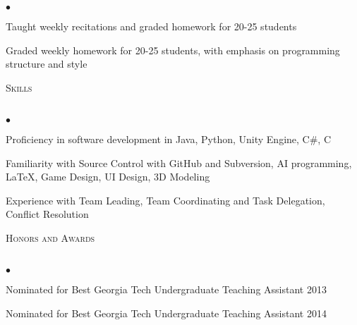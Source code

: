 \documentclass{article}
\newcommand{\lineunder}{\vspace*{-8pt} \\ \hspace*{-18pt} \hrulefill \\}
\newcommand{\header}[1]{{\hspace*{-15pt}\vspace*{6pt} \textsc{#1}} \vspace*{-6pt} \lineunder}
\newenvironment{achievements}{\begin{list}{$\bullet$}{\topsep 0pt \itemsep -2pt}}{\vspace*{4pt}\end{list}}
\begin{document}
	\begin{achievements}
	\item Taught weekly recitations and graded homework for 20-25 students
	\item Graded weekly homework for 20-25 students, with emphasis on programming structure and style
	\end{achievements}

\vspace*{18pt}
\header{Skills}
\begin{achievements}
    \item Proficiency in software development in Java, Python, Unity Engine, C\#, C
    \item Familiarity with Source Control with GitHub and Subversion, AI programming, \LaTeX, Game Design, UI Design, 3D Modeling
    \item Experience with Team Leading, Team Coordinating and Task Delegation, Conflict Resolution
\end{achievements}

\vspace*{18pt}
\header{Honors and Awards}
\begin{achievements}
    \item Nominated for Best Georgia Tech Undergraduate Teaching Assistant 2013
    \item Nominated for Best Georgia Tech Undergraduate Teaching Assistant 2014
\end{achievements}
\end{document}
